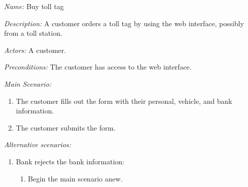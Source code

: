 \textit {Name: } Buy toll tag

\textit {Description: } A customer orders a toll tag by using the web interface, possibly from a toll station.

\textit {Actors: } A customer.

\textit {Preconditions: } The customer has access to the web interface.

\textit{Main Scenario: }

\begin{enumerate}
	\item The customer fills out the form with their personal, vehicle, and bank information.
	\item The customer submits the form.
\end{enumerate}

\textit{Alternative scenarios: }

\begin{enumerate}
	\item Bank rejects the bank information:
	\begin{enumerate}
		\item Begin the main scenario anew.
	\end{enumerate}
\end{enumerate}